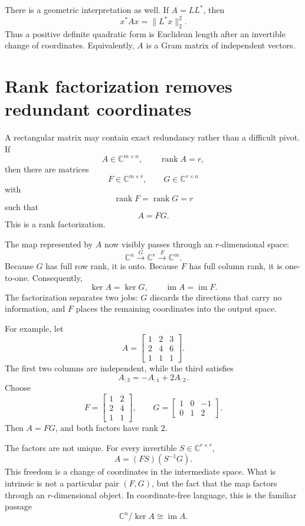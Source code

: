 There is a geometric interpretation as well.  If \(A=LL^*\), then
\[
  x^*Ax=\|L^*x\|_2^2.
\]
Thus a positive definite quadratic form is Euclidean length after an invertible change of coordinates.  Equivalently, \(A\) is a Gram matrix of independent vectors.

\section{Rank factorization removes redundant coordinates}

A rectangular matrix may contain exact redundancy rather than a difficult pivot.  If
\[
  A\in\mathbb C^{m\times n},
  \qquad
  \operatorname{rank}A=r,
\]
then there are matrices
\[
  F\in\mathbb C^{m\times r},
  \qquad
  G\in\mathbb C^{r\times n}
\]
with
\[
  \operatorname{rank}F=\operatorname{rank}G=r
\]
such that
\[
  A=FG.
\]
This is a rank factorization.

The map represented by \(A\) now visibly passes through an \(r\)-dimensional space:
\[
  \mathbb C^n
  \xrightarrow{\ G\ }
  \mathbb C^r
  \xrightarrow{\ F\ }
  \mathbb C^m.
\]
Because \(G\) has full row rank, it is onto.  Because \(F\) has full column rank, it is one-to-one.  Consequently,
\[
  \ker A=\ker G,
  \qquad
  \operatorname{im}A=\operatorname{im}F.
\]
The factorization separates two jobs: \(G\) discards the directions that carry no information, and \(F\) places the remaining coordinates into the output space.

For example, let
\[
  A=
  \begin{bmatrix}
    1&2&3\\
    2&4&6\\
    1&1&1
  \end{bmatrix}.
\]
The first two columns are independent, while the third satisfies
\[
  A_{:3}=-A_{:1}+2A_{:2}.
\]
Choose
\[
  F=
  \begin{bmatrix}
    1&2\\
    2&4\\
    1&1
  \end{bmatrix},
  \qquad
  G=
  \begin{bmatrix}
    1&0&-1\\
    0&1&2
  \end{bmatrix}.
\]
Then \(A=FG\), and both factors have rank \(2\).

The factors are not unique.  For every invertible \(S\in\mathbb C^{r\times r}\),
\[
  A=(FS)(S^{-1}G).
\]
This freedom is a change of coordinates in the intermediate space.  What is intrinsic is not a particular pair \((F,G)\), but the fact that the map factors through an \(r\)-dimensional object.  In coordinate-free language, this is the familiar passage
\[
  \mathbb C^n/\ker A
  \cong
  \operatorname{im}A.
\]

